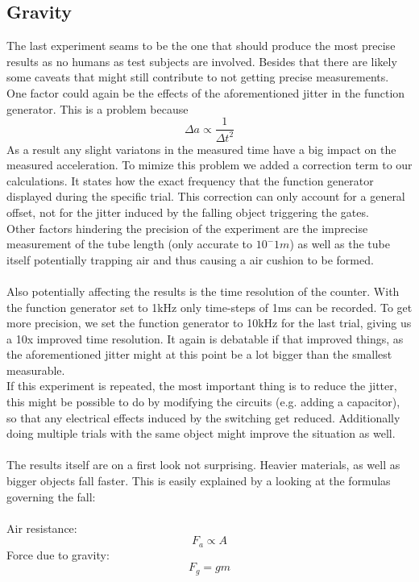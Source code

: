 \documentclass[fleqn,14pt]{article}
\begin{document}
\subsection{Gravity}
The last experiment seams to be the one that should produce the most precise results as no humans as test
subjects are involved.
Besides that there are likely some caveats that might still contribute to not getting precise measurements.\\
One factor could again be the effects of the aforementioned jitter in the function generator.
This is a problem because
$$
\Delta a \propto \frac{1}{\Delta t^2}
$$
As a result any slight variatons in the measured time have a big impact on the measured acceleration. To mimize
this problem we added a correction term to our calculations. It states how the exact frequency that the
function generator displayed during the specific trial. This correction can only account for a general offset,
not for the jitter induced by the falling object triggering the gates.\\
Other factors hindering the precision of the experiment are the imprecise measurement of the tube length (only
accurate to $10^-1m$) as well as the tube itself potentially trapping air and thus causing a air cushion to
be formed. \\
\\
Also potentially affecting the results is the time resolution of the counter. With the function generator
set to 1kHz only time-steps of 1ms can be recorded. To get more precision, we set the function generator
to 10kHz for the last trial, giving us a 10x improved time resolution. It again is debatable if that improved
things, as the aforementioned jitter might at this point be a lot bigger than the smallest measurable.
\\
If this experiment is repeated, the most important thing is to reduce the jitter, this might be possible to
do by modifying the circuits (e.g. adding a capacitor), so that any electrical effects induced by the switching
get reduced. Additionally doing multiple trials with the same object might improve the situation as well.\\
\\
The results itself are on a first look not surprising. Heavier materials, as well as bigger objects fall faster.
This is easily explained by a looking at the formulas governing the fall:\\
\\
Air resistance:
$$
F_a \propto A
$$
Force due to gravity:
$$
F_g = g m
$$
\end{document}
